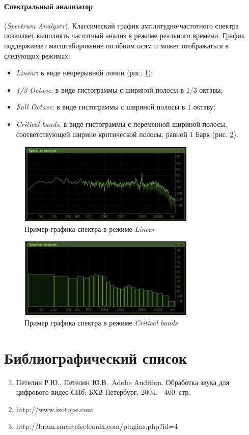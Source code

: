 \documentclass[oneside, final, 14pt]{extreport}
\begin{document}
\paragraph{Спектральный анализатор} (\textit{Spectrum Analyzer}). Классический график амплитудно-частотного спектра позволяет выполнять частотный анализ в режиме реального времени. График поддерживает масштабирование по обоим осям и может отображаться в следующих режимах:
\begin{itemize}
\item \textit{Linear}: в виде непрерывной линии (рис. \ref{pic-insight-14});
\item \textit{1/3 Octave}: в виде гистограммы с шириной полосы в $1/3$ октавы; 
\item \textit{Full Octave}: в виде гистограммы с шириной полосы в $1$ октаву;
\item \textit{Critical bands}: в виде гистограммы с переменной шириной полосы, соответствующей ширине критической полосы, равной $1$ Барк (рис. \ref{pic-insight-15}). 
\end{itemize}

\begin{figure}[h!]
\centering
\includegraphics[width=0.75\textwidth]{pic-insight-14}
\caption{Пример графика спектра в режиме \textit{Linear}}
\label{pic-insight-14}
\end{figure}

\begin{figure}[h!]
\centering
\includegraphics[width=0.75\textwidth]{pic-insight-15}
\caption{Пример графика спектра в режиме \textit{Critical bands}}
\label{pic-insight-15}
\end{figure}

\section*{Библиографический список}
\begin{enumerate}
\item Петелин Р.Ю., Петелин Ю.В.~Adobe Audition. Обработка звука для цифрового видео СПб: БХВ-Петербург, 2004. - 400~стр.
\item http://www.izotope.com
\item http://bram.smartelectronix.com/plugins.php?id=4
\end{enumerate}
\end{document}
